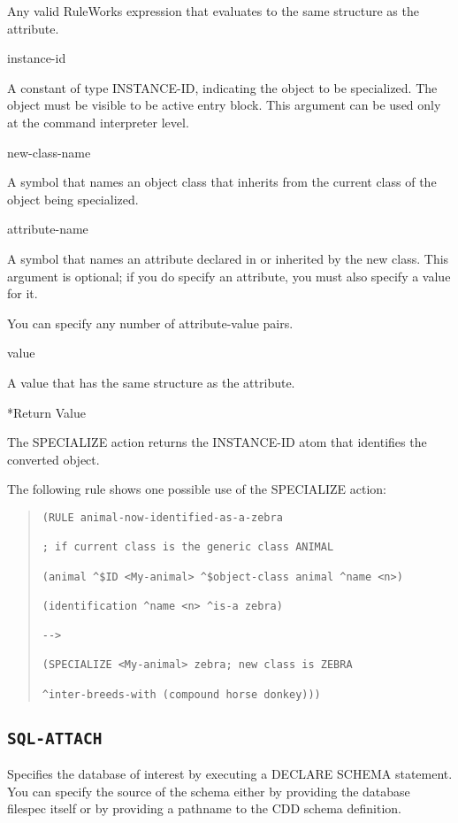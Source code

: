 {{Any valid RuleWorks expression that evaluates to the same
structure as the attribute.

instance-id

A constant of type INSTANCE-ID, indicating the object to be
specialized. The object must be visible to be active entry
block. This argument can be used only at the command
interpreter level.

new-class-name

A symbol that names an object class that inherits from the
current class of the object being specialized.

attribute-name

A symbol that names an attribute declared in or inherited by
the new class. This argument is optional; if you do specify
an attribute, you must also specify a value for it.

You can specify any number of attribute-value pairs.

value

A value that has the same structure as the attribute.

*Return Value

The SPECIALIZE action returns the INSTANCE-ID atom that
identifies the converted object.

\Example

The following rule shows one possible use of the SPECIALIZE
action:
\begin{quote}
\begin{verbatim}
(RULE animal-now-identified-as-a-zebra

; if current class is the generic class ANIMAL

(animal ^$ID <My-animal> ^$object-class animal ^name <n>)

(identification ^name <n> ^is-a zebra)

-->

(SPECIALIZE <My-animal> zebra; new class is ZEBRA

^inter-breeds-with (compound horse donkey)))
\end{verbatim}
\end{quote}

\subsection{\tt{SQL-ATTACH}}

Specifies the database of interest by executing a DECLARE
SCHEMA statement. You can specify the source of the schema
either by providing the database filespec itself or by
providing a pathname to the CDD schema definition.

}}
